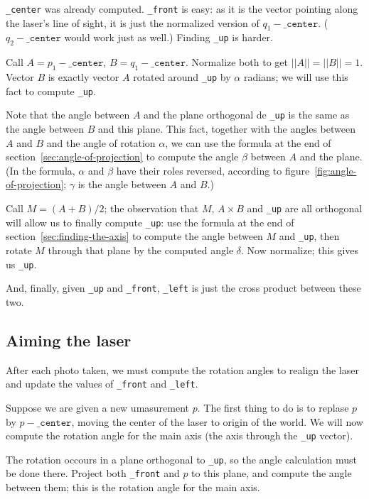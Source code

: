 \documentclass{article}
\newcommand\attribute[1]{\texttt{#1}}
\begin{document}
\attribute{\_center} was already computed.
\attribute{\_front} is easy: as it is the vector pointing along
the laser's line of sight,
it is just the normalized version of $q_1 - \attribute{\_center}$.
($q_2 - \attribute{\_center}$ would work just as well.)
Finding \attribute{\_up} is harder.

Call $A = p_1 - \attribute{\_center}$, $B = q_1 - \attribute{\_center}$.
Normalize both to get $||A|| = ||B|| = 1$.
Vector $B$ is exactly vector $A$ rotated around \attribute{\_up}
by $\alpha$ radians;
we will use this fact to compute \attribute{\_up}.

Note that the angle between $A$ and the plane orthogonal de \attribute{\_up}
is the same as the angle between $B$ and this plane.
This fact, together with the angles between $A$ and $B$
and the angle of rotation $\alpha$,
we can use the formula at the end of section~\ref{sec:angle-of-projection}
to compute the angle $\beta$ between $A$ and the plane.
(In the formula, $\alpha$ and $\beta$ have their roles reversed,
according to figure~\ref{fig:angle-of-projection};
$\gamma$ is the angle between $A$ and $B$.)

Call $M = (A + B)/2$; the observation that $M$,
$A \times B$ and \attribute{\_up} are all orthogonal
will allow us to finally compute \attribute{\_up}:
use the formula at the end of section~\ref{sec:finding-the-axis}
to compute the angle between $M$ and \attribute{\_up},
then rotate $M$ through that plane by the computed angle $\delta$.
Now normalize;
this gives us \attribute{\_up}.

And, finally, given \attribute{\_up} and \attribute{\_front},
\attribute{\_left} is just the cross product between these two.

\subsection{Aiming the laser}

After each photo taken,
we must compute the rotation angles to realign the laser
and update the values of \attribute{\_front} and \attribute{\_left}.

Suppose we are given a new umasurement $p$.
The first thing to do is to replase $p$ by $p - \attribute{\_center}$,
moving the center of the laser to origin of the world.
We will now compute the rotation angle for the main axis
(the axis through the \attribute{\_up} vector).

The rotation occours in a plane orthogonal to \attribute{\_up},
so the angle calculation must be done there.
Project both \attribute{\_front} and $p$ to this plane,
and compute the angle between them;
this is the rotation angle for the main axis.
\end{document}
